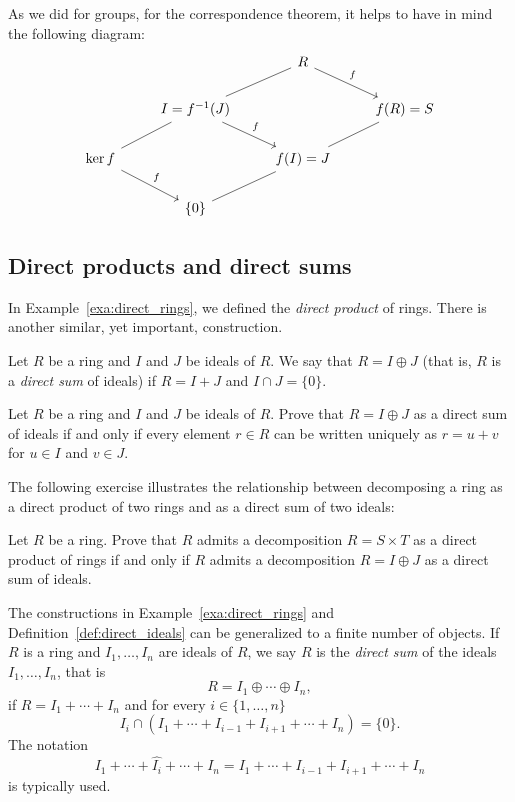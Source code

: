 As we did for groups, for the correspondence theorem, 
it helps to have in mind the following diagram: 
\[
\begin{tikzcd}
        && R \\
        & I=f^{-1}(J) && f(R)=S \\
        \ker f && f(I)=J \\
        & {\{0\}}
        \arrow["f", from=1-3, to=2-4]
        \arrow[no head, from=1-3, to=2-2]
        \arrow[no head, from=2-2, to=3-1]
        \arrow["f", from=3-1, to=4-2]
        \arrow["f", from=2-2, to=3-3]
        \arrow[no head, from=3-3, to=4-2]
        \arrow[no head, from=2-4, to=3-3]
\end{tikzcd}
\]

\subsection{Direct products and direct sums}

In Example~\ref{exa:direct_rings}, we defined the \emph{direct product} of rings. There is another similar, yet important, construction.

\begin{definition}
\label{def:direct_ideals}
Let $R$ be a ring and $I$ and $J$ be ideals of $R$. We say that 
$R=I\oplus J$ (that is, $R$ is a \emph{direct sum} of ideals) 
if $R=I+J$ and $I\cap J=\{0\}$.  
\end{definition}

\begin{exercise}
\label{xca:uniqueness}
    Let $R$ be a ring and $I$ and $J$ be ideals of $R$. 
    Prove that $R=I\oplus J$ as a direct sum of ideals if and only if 
    every element $r\in R$ can be written uniquely as 
    $r=u+v$ for $u\in I$ and $v\in J$.
\end{exercise}

The following exercise illustrates the relationship between decomposing a 
ring as a direct product of two rings and as a direct sum of two ideals:

\begin{exercise}
\label{xca:products}
    Let $R$ be a ring. Prove that $R$ admits a decomposition 
    $R=S\times T$ as a direct product of rings if and only if $R$ admits a decomposition 
    $R=I\oplus J$ as a direct sum of ideals. 
\end{exercise}

The constructions in Example~\ref{exa:direct_rings} and Definition~\ref{def:direct_ideals}
can be generalized to a finite number of objects. 
If $R$ is a ring and $I_1,\dots,I_n$ are ideals of $R$, we say 
$R$ is the \emph{direct sum} of the ideals $I_1,\dots,I_n$, 
that is 
\[
R=I_1\oplus\cdots\oplus I_n, 
\]
if $R=I_1+\cdots+I_n$ and 
for every $i\in\{1,\dots,n\}$
\[
I_i\cap (I_1+\cdots+I_{i-1}+I_{i+1}+\cdots+I_n)=\{0\}.
\]
The notation
\[
I_1+\cdots+\widehat{I_i}+\cdots+I_n=I_1+\cdots+I_{i-1}+I_{i+1}+\cdots+I_n
\]
is typically used. 

